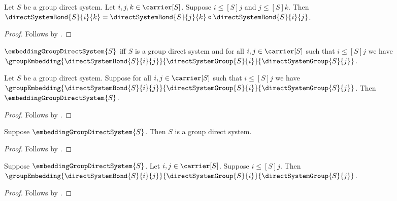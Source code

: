 \begin{proposition}\label{direct_system_bond_composition}
    Let $S$ be a group direct system.
    Let $i,j,k\in\carrier[S]$.
    Suppose $i\mathrel{\leq[S]}j$ and $j\mathrel{\leq[S]}k$.
    Then $\directSystemBond{S}{i}{k}
        =\directSystemBond{S}{j}{k}\circ
            \directSystemBond{S}{i}{j}$.
\end{proposition}
\begin{proof}
    Follows by
        .
\end{proof}

\begin{definition}\label{embedding_group_direct_system}
    $\embeddingGroupDirectSystem{S}$ iff
        $S$ is a group direct system and
        for all $i,j\in\carrier[S]$ such that
            $i\mathrel{\leq[S]}j$ we have
            $\groupEmbedding
                {\directSystemBond{S}{i}{j}}
                {\directSystemGroup{S}{i}}
                {\directSystemGroup{S}{j}}$.
\end{definition}

\begin{proposition}\label{embedding_group_direct_system_intro}
    Let $S$ be a group direct system.
    Suppose for all $i,j\in\carrier[S]$ such that
        $i\mathrel{\leq[S]}j$ we have
        $\groupEmbedding
            {\directSystemBond{S}{i}{j}}
            {\directSystemGroup{S}{i}}
            {\directSystemGroup{S}{j}}$.
    Then $\embeddingGroupDirectSystem{S}$.
\end{proposition}
\begin{proof}
    Follows by .
\end{proof}

\begin{proposition}\label{embedding_group_direct_system_is_system}
    Suppose $\embeddingGroupDirectSystem{S}$.
    Then $S$ is a group direct system.
\end{proposition}
\begin{proof}
    Follows by .
\end{proof}

\begin{proposition}\label{embedding_direct_system_bond}
    Suppose $\embeddingGroupDirectSystem{S}$.
    Let $i,j\in\carrier[S]$.
    Suppose $i\mathrel{\leq[S]}j$.
    Then $\groupEmbedding
        {\directSystemBond{S}{i}{j}}
        {\directSystemGroup{S}{i}}
        {\directSystemGroup{S}{j}}$.
\end{proposition}
\begin{proof}
    Follows by .
\end{proof}

